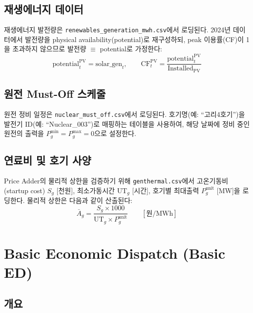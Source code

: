 \documentclass[11pt, a4paper]{article}
\begin{document}
\subsection{재생에너지 데이터}

재생에너지 발전량은 \texttt{renewables\_generation\_mwh.csv}에서 로딩된다.
2024년 데이터에서 발전량을 physical availability(potential)로 재구성하되,
peak 이용률(CF)이 1을 초과하지 않으므로 발전량 $\equiv$ potential로 가정한다:
\begin{equation}
    \text{potential}_{t}^{\text{PV}} = \text{solar\_gen}_t, \qquad
    \text{CF}_t^{\text{PV}} = \frac{\text{potential}_t^{\text{PV}}}{\text{Installed}_{\text{PV}}}
\end{equation}

\subsection{원전 Must-Off 스케줄}

원전 정비 일정은 \texttt{nuclear\_must\_off.csv}에서 로딩된다.
호기명(예: ``고리4호기'')을 발전기 ID(예: ``Nuclear\_003'')로 매핑하는 테이블을 사용하여,
해당 날짜에 정비 중인 원전의 출력을 $P_g^{\min} = P_g^{\max} = 0$으로 설정한다.

\subsection{연료비 및 호기 사양}

Price Adder의 물리적 상한을 검증하기 위해 \texttt{genthermal.csv}에서
고온기동비(startup cost) $S_g$ [천원], 최소가동시간 $\text{UT}_g$ [시간],
호기별 최대출력 $P_g^{\text{unit}}$ [MW]을 로딩한다.
물리적 상한은 다음과 같이 산출된다:
\begin{equation}\label{eq:adder_bound}
    \bar{A}_g = \frac{S_g \times 1000}{\text{UT}_g \times P_g^{\text{unit}}} \qquad [\text{원/MWh}]
\end{equation}


\section{Basic Economic Dispatch (Basic ED)}\label{sec:basic_ed}

\subsection{개요}
\end{document}
